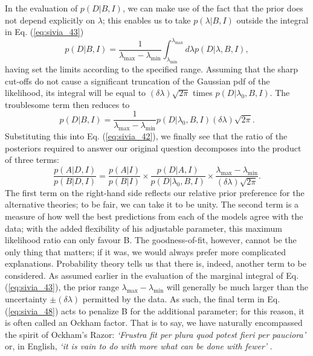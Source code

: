 \documentclass[%
oneside,                 %
final,                   %
10pt]{article}
\begin{document}
In the evaluation of $p(D | B , I )$, we can make use of the fact that the prior does not depend explicitly on $\lambda$; this enables us to take $p(\lambda|B,I)$ outside the integral in Eq. (\ref{eq:sivia_43})
\begin{equation}
p(D|B,I) = \frac{1}{\lambda_\mathrm{max} - \lambda_\mathrm{min}} \int_{\lambda_\mathrm{min}}^{\lambda_\mathrm{max}} d\lambda
p(D|\lambda,B,I),
\label{eq:sivia_46}
\end{equation}
having set the limits according to the specified range. Assuming that the sharp cut-offs
do not cause a significant truncation of the Gaussian pdf of the likelihood,
its integral will be equal to $(\delta\lambda) \sqrt{2\pi}$ times $p(D|\lambda_0,B,I)$. The troublesome term then reduces to
$$
p(D|B,I) = \frac{1}{\lambda_\mathrm{max} - \lambda_\mathrm{min}} p(D|\lambda_0,B,I) (\delta\lambda) \sqrt{2\pi}.
$$
Substituting this into Eq. (\ref{eq:sivia_42}), we finally see that the ratio of the posteriors required to answer our original question decomposes into the product of three terms:
\begin{equation}
\frac{p(A|D,I)}{p(B|D,I)} =  \frac{p(A|I)}{p(B|I)} \times \frac{p(D|A,I)}{p(D|\lambda_0,B,I)} \times \frac{\lambda_\mathrm{max} - \lambda_\mathrm{min}}{(\delta\lambda) \sqrt{2\pi}}. 
\label{eq:sivia_48}
\end{equation}
The first term on the right-hand side reflects our relative prior preference for the alternative theories; to be fair, we can take it to be unity. The second term is a measure of how well the best predictions from each of the models agree with the data; with the added flexibility of his adjustable parameter, this maximum likelihood ratio can only favour B. The goodness-of-fit, however, cannot be the only thing that matters; if it was, we would always prefer more complicated explanations. Probability theory tells us that there is, indeed, another term to be considered. As assumed earlier in the evaluation of the marginal integral of Eq. (\ref{eq:sivia_43}), the prior range $\lambda_\mathrm{max} - \lambda_\mathrm{min}$ will generally be much larger than the uncertainty $\pm(\delta\lambda)$ permitted by the data. As such, the final term in Eq. (\ref{eq:sivia_48}) acts to penalize B for the additional parameter; for this reason, it is often called an Ockham factor. That is to say, we have naturally encompassed the spirit of Ockham’s Razor: \emph{‘Frustra fit per plura quod potest fieri per pauciora’} or, in English, \emph{‘it is vain to do with more what can be done with fewer’} .
\end{document}
